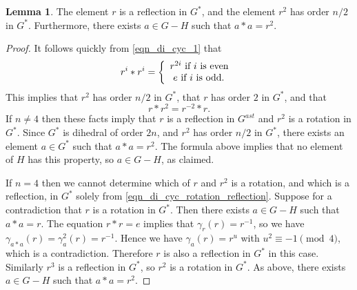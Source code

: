 \documentclass[reqno]{amsart}
\theoremstyle{definition}
\newtheorem{lemma}[theorem]{Lemma}
\begin{document}
\begin{lemma}
The element $ r $ is a reflection in $ G^{\ast} $, and the element $ r^{2} $ has order $ n/2 $ in $ G^{\ast} $. Furthermore, there exists $ a \in G - H $ such that $ a \ast a = r^{2} $.
\end{lemma}
\begin{proof}
It follows quickly from \eqref{eqn_di_cyc_1} that
\[ r^{i} \ast r^{i} = \left\{ \begin{array}{cl} r^{2i} \mbox{ if $ i $ is even } \\ e \mbox{ if $ i $ is odd. } \end{array} \right. \]
This implies that $ r^{2} $ has order $ n/2 $ in $ G^{\ast} $, that $ r $ has order $ 2 $ in $ G^{\ast} $, and that 
\begin{equation} \label{eqn_di_cyc_rotation_reflection}
r \ast r^{2} = r^{-2} \ast r. 
\end{equation}
If $ n \neq 4 $ then these facts imply that $ r $ is a reflection in $ G^{ast} $ and $ r^{2} $ is a rotation in $ G^{\ast}$. Since $ G^{\ast} $ is dihedral of order $ 2n $, and $ r^{2} $ has order $ n/2 $ in $ G^{\ast} $, there exists an element $ a \in G^{\ast} $ such that $ a \ast a = r^{2} $. The formula above implies that no element of $ H $ has this property, so $ a \in G - H $, as claimed.

If $ n=4 $ then we cannot determine which of $ r $ and $ r^{2} $ is a rotation, and which is a reflection, in $ G^{\ast} $ solely from \eqref{eqn_di_cyc_rotation_reflection}. Suppose for a contradiction that $ r $ is a rotation in $ G^{\ast} $. Then there exists $ a \in G - H $ such that $ a \ast a = r $. The equation $ r \ast r = e $ implies that $ \gamma_{r}(r) = r^{-1} $, so we have $ \gamma_{a \ast a}(r) = \gamma_{a}^{2}(r) = r^{-1} $. Hence we have $ \gamma_{a}(r) = r^{u} $ with $ u^{2} \equiv -1 \pmod{4} $, which is a contradiction. Therefore $ r $ is also a reflection in $ G^{\ast} $ in this case. Similarly $ r^{3} $ is a reflection in $ G^{\ast} $, so $ r^{2} $ is a rotation in $ G^{\ast} $. As above, there exists $ a \in G - H $ such that $ a \ast a = r^{2} $. 
\end{proof}
\end{document}
